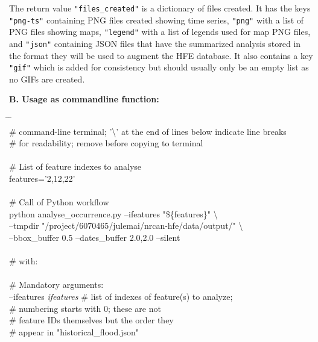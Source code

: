 \documentclass[10pt,a4paper,titlepage,parskip]{scrartcl}
\newenvironment{ttfont}{\fontfamily{\ttdefault}\selectfont}{\par}
\newcommand{\GRAU}[1]{\textcolor{ufzgray2}{#1}}
\begin{document}
\vspace*{-0.3cm}
The return value \texttt{"files\_created"} is a dictionary of files created. It has the keys \texttt{"png-ts"} containing PNG files created showing time series, \texttt{"png"} with a list of PNG files showing maps, \texttt{"legend"} with a list of legends used for map PNG files, and \texttt{"json"} containing JSON files that have the summarized analysis stored in the format they will be used to augment the HFE database. It also contains a key \texttt{"gif"} which is added for consistency but should usually only be an empty list as no GIFs are created.
\pagebreak

\textbf{B. Usage as commandline function:}
\begin{framed}
	\vspace*{-1.2cm}
	\begin{ttfont}
		\begin{tabbing}
			\hspace{0.5cm} \= \hspace{5.2cm} \= \kill \\[4pt]
			\GRAU{\# command-line terminal; '\textbackslash' at the end of lines below indicate line breaks}\\
			\GRAU{\# for readability; remove before copying to terminal}\\
			\\
			\GRAU{\# List of feature indexes to analyse}\\
			features='2,12,22'\\
			\\
			\GRAU{\# Call of Python workflow}\\
			python analyse\_occurrence.py --ifeatures "\$\{features\}" \textbackslash \\
			\> --tmpdir "/project/6070465/julemai/nrcan-hfe/data/output/" \textbackslash \\
			\> --bbox\_buffer 0.5 --dates\_buffer 2.0,2.0 --silent\\
			\\
			\GRAU{\# with:}\\
			\\
			\> \GRAU{\# Mandatory arguments:}\\
			\> --ifeatures \textit{ifeatures} \> \GRAU{\# list of indexes of feature(s) to analyze;}\\
			\> \> \GRAU{\# numbering starts with 0; these are not }\\
			\> \> \GRAU{\# feature IDs themselves but the order they }\\
			\> \> \GRAU{\# appear in "historical\_flood.json"}\\

\end{tabbing}
\end{ttfont}
\end{framed}
\end{document}
